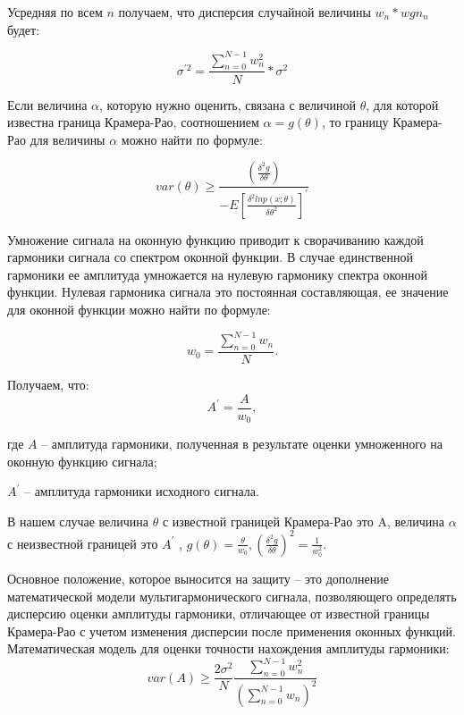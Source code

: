Усредняя по всем $n$ получаем, что дисперсия случайной величины $w_n*wgn_n$ будет: 

\begin{equation}
	\label{eq:equation14}
	\sigma^{'2}=\frac{\sum_{n=0}^{N-1} w_n^2}{N}*\sigma^2
\end{equation}

Если величина $\alpha$, которую нужно оценить, связана с величиной $\theta$, для которой известна граница Крамера-Рао, соотношением $\alpha=g(\theta)$, то границу Крамера-Рао для величины $\alpha$ можно найти по формуле: 

\begin{equation}
	\label{eq:equation15}
	var(\theta)\geq \frac{\left(\frac{\delta^2 g}{\delta\theta}\right)}{-E\left[\frac{\delta^2 ln p(x;\theta)}{\delta \theta^2}\right]^{'}}
\end{equation}

Умножение сигнала на оконную функцию приводит к сворачиванию каждой гармоники сигнала со спектром оконной функции. В случае единственной гармоники ее амплитуда умножается на нулевую гармонику спектра оконной функции. Нулевая гармоника сигнала это постоянная составляющая, ее значение для оконной функции можно найти по формуле: 

\begin{equation}
	\label{eq:equation16}
	w_0= \frac{\sum_{n=0}^{N-1} w_n}{N}.	  
\end{equation}

Получаем, что: 
\begin{equation}
	\label{eq:equation17}
	A^{'}=\frac{A}{w_0} ,		  
\end{equation}

где $A$ -- амплитуда гармоники, полученная в результате оценки умноженного на оконную функцию сигнала; 

$A^{'}$ -- амплитуда гармоники исходного сигнала.

В нашем случае величина $\theta$ с известной границей Крамера-Рао это A, величина $\alpha$ с неизвестной границей это  $A^{'}$ , $g(\theta)=\frac{\theta}{w_0}, \left(\frac{\delta^2 g}{\delta \theta}\right)^2=\frac{1}{w_0^2}$.

Основное положение, которое выносится на защиту -- это дополнение математической модели мультигармонического сигнала, позволяющего определять дисперсию оценки амплитуды гармоники, отличающее от известной границы Крамера-Рао с учетом изменения дисперсии после применения оконных функций. Математическая модель для оценки точности нахождения амплитуды гармоники:
\begin{equation}
	\label{eq:equation18}
	var(A)\geq \frac{2\sigma^2}{N} \frac{\sum_{n=0}^{N-1}w_n^2}{\left(\sum_{n=0}^{N-1} w_n \right)^2} 			  
\end{equation}


